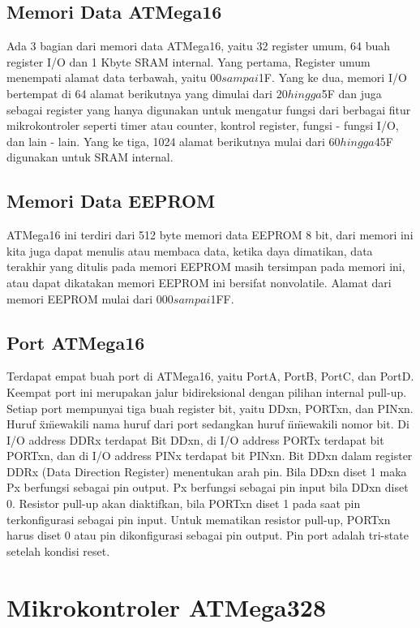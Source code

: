 	\subsection{Memori Data ATMega16}
		 Ada 3 bagian dari memori data ATMega16, yaitu 32 register umum, 64 buah register I/O dan 1 Kbyte SRAM internal. Yang pertama, Register umum menempati alamat data terbawah, yaitu $00 sampai $1F. Yang ke dua, memori I/O bertempat di 64 alamat berikutnya yang dimulai dari $20 hingga $5F dan juga sebagai register yang hanya digunakan untuk mengatur fungsi dari berbagai fitur mikrokontroler seperti timer atau counter, kontrol register, fungsi - fungsi I/O, dan lain - lain.  Yang ke tiga, 1024 alamat berikutnya mulai dari $60 hingga $45F digunakan untuk SRAM internal.
	\subsection{Memori Data EEPROM}
		ATMega16 ini terdiri dari 512 byte memori data EEPROM 8 bit, dari memori ini kita juga dapat menulis atau membaca data, ketika daya dimatikan, data terakhir yang ditulis pada memori EEPROM masih tersimpan pada memori ini, atau dapat dikatakan memori EEPROM ini bersifat nonvolatile. Alamat dari memori EEPROM mulai dari $000 sampai $1FF.
	\subsection{Port ATMega16}
		Terdapat empat buah port di ATMega16, yaitu PortA, PortB, PortC, dan PortD. Keempat port ini merupakan jalur  bidireksional dengan pilihan  internal pull-up. Setiap port mempunyai tiga buah register bit, yaitu DDxn, PORTxn, dan PINxn. Huruf \"x\" mewakili nama huruf dari port sedangkan huruf \"n\" mewakili nomor bit. Di I/O address DDRx terdapat Bit DDxn, di I/O address PORTx terdapat bit PORTxn, dan di I/O address PINx terdapat bit PINxn. Bit DDxn dalam register DDRx (Data Direction Register) menentukan arah pin. Bila DDxn diset 1 maka  Px berfungsi sebagai pin output. Px berfungsi sebagai pin input bila DDxn diset 0. Resistor pull-up akan diaktifkan, bila PORTxn diset 1 pada saat pin terkonfigurasi sebagai pin input. Untuk mematikan resistor  pull-up, PORTxn harus diset 0 atau pin dikonfigurasi sebagai pin output. Pin port adalah  tri-state setelah kondisi reset.

\section{Mikrokontroler ATMega328}
